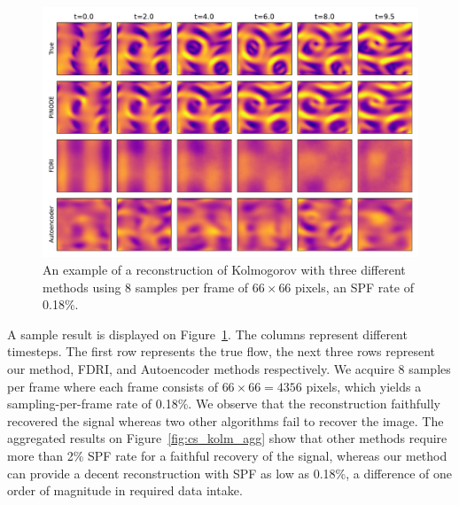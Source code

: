 \begin{figure}[t]
	\centering
	\includegraphics[width=\textwidth]{figures/cs_kolm_example.pdf}
	\caption{\label{fig:kolmogorov_example} An example of a reconstruction of Kolmogorov with three different methods using 8 samples per frame of $66\times 66$ pixels, an SPF rate of 0.18\%.}
\end{figure}

A sample result is displayed on Figure~\ref{fig:kolmogorov_example}. The columns represent different timesteps. The first row represents the true flow, the next three rows represent our method, FDRI, and Autoencoder methods respectively. We acquire 8 samples per frame where each frame consists of $66\times 66=4356$ pixels, which yields a sampling-per-frame rate of 0.18\%. We observe that the reconstruction faithfully recovered the signal whereas two other algorithms fail to recover the image. The aggregated results on Figure~\ref{fig:cs_kolm_agg} show that other methods require more than 2\% SPF rate for a faithful recovery of the signal, whereas our method can provide a decent reconstruction with SPF as low as 0.18\%, a difference of one order of magnitude in required data intake.

